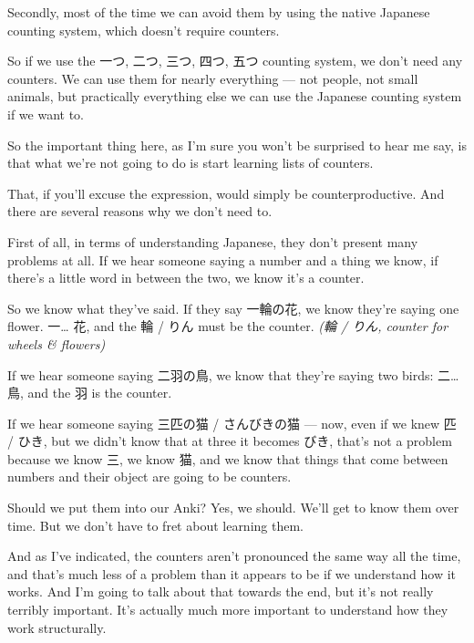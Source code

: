 \thinrule

Secondly, most of the time we can avoid them by using the native Japanese counting system, which doesn't require counters.

{}

So if we use the 一つ, 二つ, 三つ, 四つ, 五つ counting system, we don't need any counters. We can use them for nearly everything --- not people, not small animals, but practically everything else we can use the Japanese counting system if we want to.

So the important thing here, as I'm sure you won't be surprised to hear me say, is that what we're not going to do is start learning lists of counters.

{}

That, if you'll excuse the expression, would simply be counterproductive. And there are several reasons why we don't need to.

\startsectionlevel[title={Memorizing counters is not necessary},reference={memorizing-counters-is-not-necessary}]

First of all, in terms of understanding Japanese, they don't present many problems at all. If we hear someone saying a number and a thing we know, if there's a little word in between the two, we know it's a counter.

So we know what they've said. If they say 一輪の花, we know they're saying one flower. 一\ldots{} 花, and the 輪 / りん must be the counter. {\em (輪 / りん, counter for wheels & flowers)}

{}

If we hear someone saying 二羽の鳥, we know that they're saying two birds: 二\ldots{} 鳥, and the 羽 is the counter.

If we hear someone saying 三匹の猫 / さんびきの猫 --- now, even if we knew 匹 / ひき, but we didn't know that at three it becomes びき, that's not a problem because we know 三, we know 猫, and we know that things that come between numbers and their object are going to be counters.

{}

Should we put them into our Anki? Yes, we should. We'll get to know them over time. But we don't have to fret about learning them.

And as I've indicated, the counters aren't pronounced the same way all the time, and that's much less of a problem than it appears to be if we understand how it works. And I'm going to talk about that towards the end, but it's not really terribly important. It's actually much more important to understand how they work structurally.

